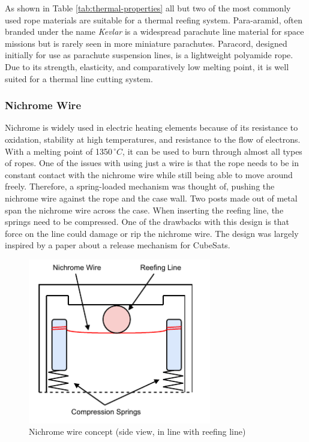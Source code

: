 As shown in Table \ref{tab:thermal-properties} all but two of the most commonly used rope materials are suitable for a thermal reefing system. Para-aramid, often branded under the name \textit{Kevlar} is a widespread parachute line material for space missions but is rarely seen in more miniature parachutes. Paracord, designed initially for use as parachute suspension lines, is a lightweight polyamide rope. Due to its strength, elasticity, and comparatively low melting point, it is well suited for a thermal line cutting system.


\subsubsection{Nichrome Wire}\label{nichrome-wire}
Nichrome is widely used in electric heating elements because of its resistance to oxidation, stability at high temperatures, and resistance to the flow of electrons.\cite{nichrome} With a melting point of 1350\,$^{\circ}C$, it can be used to burn through almost all types of ropes. One of the issues with using just a wire is that the rope needs to be in constant contact with the nichrome wire while still being able to move around freely. Therefore, a spring-loaded mechanism was thought of, pushing the nichrome wire against the rope and the case wall. Two posts made out of metal span the nichrome wire across the case. When inserting the reefing line, the springs need to be compressed. One of the drawbacks with this design is that force on the line could damage or rip the nichrome wire. The design was largely inspired by a paper about a release mechanism for CubeSats. \cite{nichrome-cubesats}  

\begin{figure}[h!]
	\centering
	\includegraphics[width=8cm]{images/nichrome-wire}
	\caption{Nichrome wire concept (side view, in line with reefing line)}
	\label{fig:nichrome-wire}
\end{figure}

